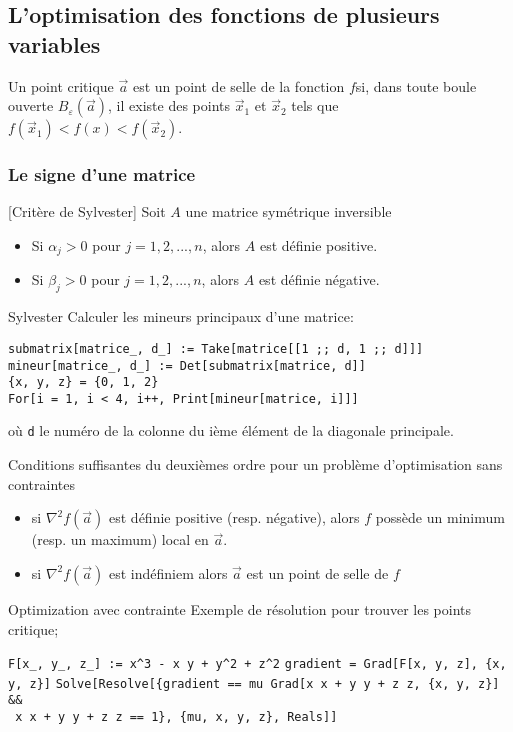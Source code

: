 	\subsection{L'optimisation des fonctions de plusieurs variables}
		\begin{mydef}
			Un point critique $\vec{a}$ est un point de selle de la fonction $f$si, dans toute boule ouverte $B_{\varepsilon}(\vec{a})$, il existe des points $\vec{x}_1$ et $\vec{x}_2$ tels que $f(\vec{x}_1)<f(x)<f(\vec{x}_2)$.
		\end{mydef}
		\subsubsection*{Le signe d'une matrice}
			\begin{mythm}[Critère de Sylvester]
				Soit $A$ une matrice symétrique inversible 
				\begin{itemize}
					\item Si $\alpha_j>0$ pour $j=1,2,...,n$, alors $A$ est définie positive.
					\item Si $\beta_j>0$ pour $j=1,2,...,n$, alors $A$ est définie négative.
				\end{itemize}
			\end{mythm}
			\begin{code}{Sylvester}
				Calculer les mineurs principaux d'une matrice\hfill : 
				\begin{flushleft}
				\verb|submatrix[matrice_, d_] := Take[matrice[[1 ;; d, 1 ;; d]]]|\\
			\verb|mineur[matrice_, d_] := Det[submatrix[matrice, d]]|\\
				\verb|{x, y, z} = {0, 1, 2}|\\
				\verb|For[i = 1, i < 4, i++, Print[mineur[matrice, i]]]|
				\end{flushleft}
				\indent\indent\indent\indent où \verb|d| le numéro de la colonne du ième élément de la diagonale principale. 
			\end{code}
		\begin{mythm}{Conditions suffisantes du deuxièmes ordre pour un problème d'optimisation sans contraintes}
			\begin{itemize}
				\item si $\nabla^2 f(\vec{a})$ est définie positive (resp. négative), alors $f$ possède un minimum (resp. un maximum) local en $\vec{a}$.
				\item si $\nabla^2 f(\vec{a})$ est indéfiniem alors $\vec{a}$ est un point de selle de $f$
			\end{itemize}
		\end{mythm}
	\begin{code}{Optimization avec contrainte}
		Exemple de résolution pour trouver les points critique\hfill ;
		\begin{flushleft}
			\verb|F[x_, y_, z_] := x^3 - x y + y^2 + z^2|
			\verb|gradient = Grad[F[x, y, z], {x, y, z}]|
			\verb|Solve[Resolve[{gradient == mu Grad[x x + y y + z z, {x, y, z}] &&|\\\verb| x x + y y + z z == 1}, {mu, x, y, z}, Reals]]|
		\end{flushleft}
	\end{code}
